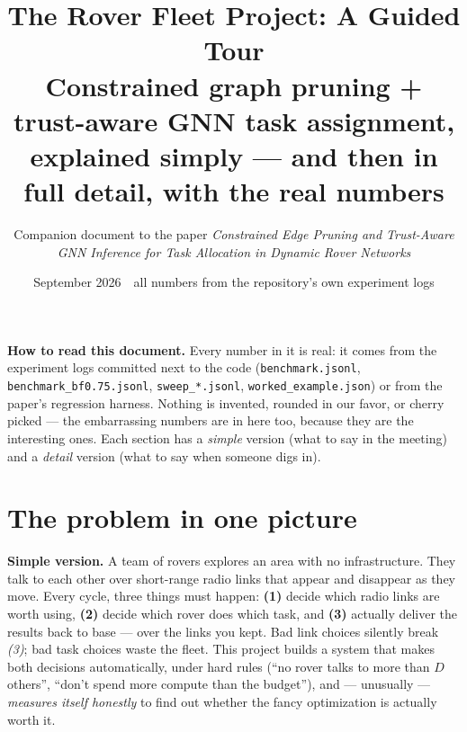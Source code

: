 \documentclass[11pt]{article}
\title{\textbf{The Rover Fleet Project: A Guided Tour}\\[4pt]
\large Constrained graph pruning + trust-aware GNN task assignment,\\
explained simply --- and then in full detail, with the real numbers}
\author{Companion document to the paper \emph{Constrained Edge Pruning and
Trust-Aware GNN Inference for Task Allocation in Dynamic Rover Networks}}
\date{September 2026 \,\textbullet\, all numbers from the repository's own
experiment logs}
\newenvironment{card}{%
  \def\FrameCommand{\fboxsep=8pt\fcolorbox{cardline}{cardbg}}%
  \MakeFramed{\advance\hsize-\width\FrameRestore}\noindent}{\endMakeFramed}
\newenvironment{goldcard}{%
  \def\FrameCommand{\fboxsep=8pt\fcolorbox{goldline}{goldbg}}%
  \MakeFramed{\advance\hsize-\width\FrameRestore}\noindent}{\endMakeFramed}
\newcommand{\code}[1]{\texttt{#1}}
\begin{document}
\maketitle

\begin{goldcard}
\textbf{How to read this document.} Every number in it is real: it comes from
the experiment logs committed next to the code
(\code{benchmark.jsonl}, \code{benchmark\_bf0.75.jsonl},
\code{sweep\_*.jsonl}, \code{worked\_example.json}) or from the paper's
regression harness. Nothing is invented, rounded in our favor, or cherry
picked --- the embarrassing numbers are in here too, because they are the
interesting ones. Each section has a \emph{simple} version (what to say in
the meeting) and a \emph{detail} version (what to say when someone digs in).
\end{goldcard}

\tableofcontents
\vspace{4mm}

\section{The problem in one picture}

\begin{card}
\textbf{Simple version.} A team of rovers explores an area with no
infrastructure. They talk to each other over short-range radio links that
appear and disappear as they move. Every cycle, three things must happen:
\textbf{(1)} decide which radio links are worth using,
\textbf{(2)} decide which rover does which task, and
\textbf{(3)} actually deliver the results back to base --- over the links
you kept. Bad link choices silently break \emph{(3)}; bad task choices waste
the fleet. This project builds a system that makes both decisions
automatically, under hard rules (``no rover talks to more than $D$
others'', ``don't spend more compute than the budget''), and --- unusually
--- \emph{measures itself honestly} to find out whether the fancy
optimization is actually worth it.
\end{card}
\end{document}

